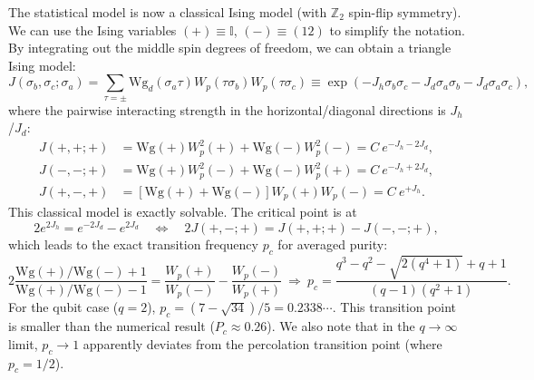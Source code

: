 \documentclass[aps,prb,superscriptaddress,nofootinbib]{revtex4}
\begin{document}
The statistical model is now a classical Ising model (with $\mathbb Z_2$ spin-flip symmetry).
We can use the Ising variables $(+) \equiv \mathbb I$, $(-) \equiv (12)$ to simplify the notation.
By integrating out the middle spin degrees of freedom, we can obtain a triangle Ising model:
\begin{equation}
	J\left(\sigma_b, \sigma_c ; \sigma_a\right)
	= \sum_{\tau=\pm} \mathrm{Wg}_d\left(\sigma_a \tau\right) W_p(\tau\sigma_b) W_p(\tau\sigma_c)
	\equiv \exp\left(-J_h\sigma_b\sigma_c-J_d \sigma_a\sigma_b-J_d \sigma_a\sigma_c\right),
\end{equation}
where the pairwise interacting strength in the horizontal/diagonal directions is $J_h$/$J_d$:
\begin{equation}
\begin{aligned}
	J(+,+;+) &= \mathrm{Wg}(+) W^2_p(+) + \mathrm{Wg}(-) W^2_p(-) = C\ e^{-J_h-2J_d}, \\
	J(-,-;+) &= \mathrm{Wg}(+) W^2_p(-) + \mathrm{Wg}(-) W^2_p(+) = C\ e^{-J_h+2J_d}, \\
	J(+,-,+) &= \left[\mathrm{Wg}(+) + \mathrm{Wg}(-)\right] W_p(+) W_p(-) = C\ e^{+J_h}.
\end{aligned}
\end{equation}
This classical model is exactly solvable.
The critical point is at
\begin{equation}
	2 e^{2J_h} = e^{-2J_d} - e^{2J_d}
	\quad \Longleftrightarrow \quad
	2J(+,-;+) = J(+,+;+) - J(-,-;+),
\end{equation}
which leads to the exact transition frequency $p_c$ for averaged purity:
\begin{equation}
	2\frac{\mathrm{Wg}(+)/\mathrm{Wg}(-)+1}{\mathrm{Wg}(+)/\mathrm{Wg}(-)-1} = \frac{W_p(+)}{W_p(-)} - \frac{W_p(-)}{W_p(+)} 
	\ \Longrightarrow \
	p_c = \frac{q^3-q^2-\sqrt{2(q^4+1)}+q+1}{(q-1) \left(q^2+1\right)}.
\end{equation}
For the qubit case ($q=2$), $p_c = (7-\sqrt{34})/5 = 0.2338\cdots$.
This transition point is smaller than the numerical result ($P_c\approx 0.26$).
We also note that in the $q\rightarrow \infty$ limit, $p_c \rightarrow 1$ apparently deviates from the percolation transition point (where $p_c=1/2$).
\end{document}
